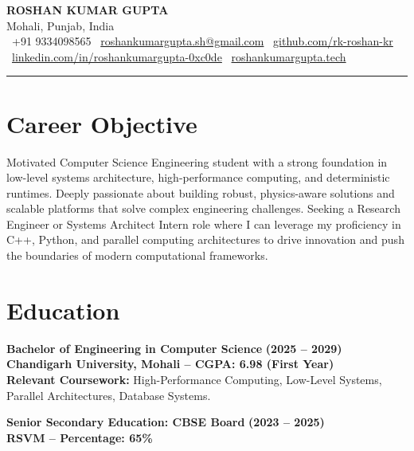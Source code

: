 \documentclass[9pt,a4paper]{extarticle}
\begin{document}
\pagestyle{empty}

\begin{center}
    {\Huge \textbf{ROSHAN KUMAR GUPTA}} \\[1.5mm]
    {\small Mohali, Punjab, India} \\[1mm]
    {\small \faPhone\ +91 9334098565 \quad \faEnvelope\ \href{mailto:roshankumargupta.sh@gmail.com}{\color{secondary}roshankumargupta.sh@gmail.com} \quad \faGithub\ \href{https://github.com/rk-roshan-kr}{\color{secondary}github.com/rk-roshan-kr}} \\
    \vspace{0.8mm}
    {\small \faLinkedin\ \href{https://linkedin.com/in/roshankumargupta-0xc0de}{\color{secondary}linkedin.com/in/roshankumargupta-0xc0de} \quad \faGlobe\ \href{https://roshankumargupta.tech}{\color{secondary}roshankumargupta.tech}}
\end{center}
\vspace{-2.5mm}
\rule{\linewidth}{0.8pt}
\vspace{-2mm}

\section{Career Objective}
Motivated Computer Science Engineering student with a strong foundation in low-level systems architecture, high-performance computing, and deterministic runtimes. Deeply passionate about building robust, physics-aware solutions and scalable platforms that solve complex engineering challenges. Seeking a Research Engineer or Systems Architect Intern role where I can leverage my proficiency in C++, Python, and parallel computing architectures to drive innovation and push the boundaries of modern computational frameworks.

\section{Education}
\textbf{Bachelor of Engineering in Computer Science} \hfill \textbf{(2025 -- 2029)} \\
{\color{primary}\textbf{Chandigarh University, Mohali -- CGPA: 6.98 (First Year)}} \\
\textbf{Relevant Coursework:} High-Performance Computing, Low-Level Systems, Parallel Architectures, Database Systems.
\vspace{0.2mm}

\textbf{Senior Secondary Education: CBSE Board} \hfill \textbf{(2023 -- 2025)} \\
{\color{primary}\textbf{RSVM -- Percentage: 65\%}}
\vspace{0.2mm}
\end{document}
